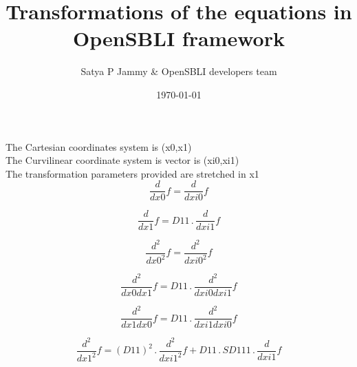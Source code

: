 \documentclass{article}
\title{Transformations of the equations in OpenSBLI framework}
\author{Satya P Jammy \& OpenSBLI developers team}
\date{\today}
\begin{document}
\maketitle
\noindent The Cartesian coordinates system is (x0,x1)\\\noindent The Curvilinear coordinate system is vector is (xi0,xi1)\\\noindent The transformation parameters provided are stretched in x1\\\begin{dmath}\frac{d}{d x0} f = \frac{d}{d xi0} f\end{dmath}

\begin{dmath}\frac{d}{d x1} f = D11 \,.\, \frac{d}{d xi1} f\end{dmath}

\begin{dmath}\frac{d^{2}}{d x0^{2}}  f = \frac{d^{2}}{d xi0^{2}}  f\end{dmath}

\begin{dmath}\frac{d^{2}}{d x0d x1}  f = D11 \,.\, \frac{d^{2}}{d xi0d xi1}  f\end{dmath}

\begin{dmath}\frac{d^{2}}{d x1d x0}  f = D11 \,.\, \frac{d^{2}}{d xi1d xi0}  f\end{dmath}

\begin{dmath}\frac{d^{2}}{d x1^{2}}  f = \left(D11 \right)^{2} \,.\, \frac{d^{2}}{d xi1^{2}}  f + D11 \,.\, SD111 \,.\, \frac{d}{d xi1} f\end{dmath}
\end{document}
